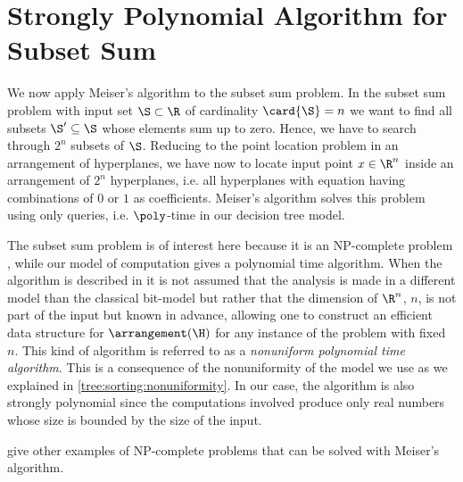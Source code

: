 \section{Strongly Polynomial Algorithm for Subset Sum}

We now apply Meiser's algorithm to the subset sum problem. In the subset sum
problem with input set $\S \subset \R$ of cardinality $\card{\S} = n$ we want to
find all subsets $\S' \subseteq \S$ whose elements sum up to zero. Hence, we have
to search through $2^n$ subsets of $\S$. Reducing to the point location problem
in an arrangement of hyperplanes, we have now to locate input point $x \in
\R^n$ inside an arrangement of $2^n$ hyperplanes, i.e. all hyperplanes with
equation having combinations of $0$ or $1$ as coefficients. Meiser's algorithm
solves this problem using only  queries, i.e. $\poly$-time
in our decision tree model.

The subset sum problem is of interest here because it is an NP-complete problem
\cite{karp:1972}, while our model of computation gives a polynomial time
algorithm. When the algorithm is described in \cite{burgisser:1997} it is not
assumed that the analysis is made in a different model than the classical
bit-model but rather that the dimension of $\R^n$, $n$, is not part of the input
but known in advance, allowing one to construct an efficient data structure for
$\arrangement(\H)$ for any instance of the problem with fixed $n$. This kind of
algorithm is referred to as a \emph{nonuniform polynomial time algorithm}.
This is a consequence of the nonuniformity of the model we use as we explained
in \ref{tree:sorting:nonuniformity}. In our case, the algorithm is
also strongly polynomial since the computations involved produce only real
numbers whose size is bounded by the size of the input.

\citet*{meiser:1993,burgisser:1997} give other examples of
NP-complete problems that can be solved with Meiser's algorithm.
